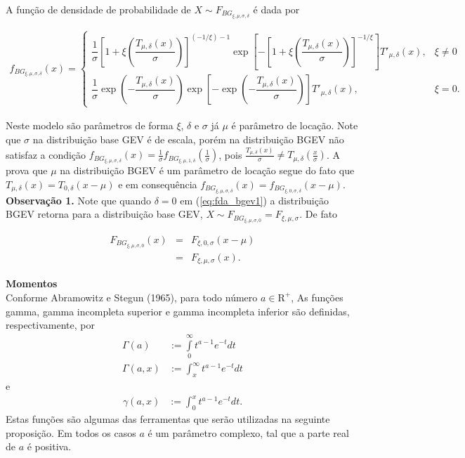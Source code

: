 \documentclass[pdftex,11pt]{article}%
\numberwithin{equation}{section} %
\begin{document}
A função de densidade de probabilidade   de $X\sim F_{BG_{\xi,\mu,\sigma, \delta}} $  é dada por

\begin{eqnarray}
	f_{BG_{\xi,\mu,\sigma, \delta}} (x)= \begin{cases}
		\dfrac{1}{\sigma} \left[ 1+ \xi \left(\dfrac{T_{\mu, \delta}(x)}{\sigma}\right) \right]^{(-1/\xi) -1} \exp\left[- \left[1+\xi\left(\dfrac{T_{\mu, \delta}(x)}        {\sigma}\right)\right]^{-1/\xi}\right] T'_{\mu, \delta}(x)
		, & \xi \neq 0 \\
		\dfrac{1}{\sigma} \exp \left( - \dfrac{T_{\mu, \delta}(x)}{\sigma} \right) \exp \left[- \exp \left( - \dfrac{T_{\mu, \delta}(x)}{\sigma}\right)  \right] T'_{\mu, \delta}(x), &  \xi=0.
	\end{cases}
	\label{eq:fdp_bgev2}
\end{eqnarray}

Neste modelo são parâmetros de forma $\xi$, $\delta$ e $\sigma$ já $\mu$ é parâmetro de locação. Note que $\sigma$ na distribuição base GEV é de escala, porém na distribuição BGEV não satisfaz a condição $f_{BG_{\xi,\mu,\sigma, \delta}}(x)=\frac{1}{\sigma}f_{BG_{\xi,\mu,1, \delta}}(\frac{1}{\sigma})$, pois $\frac{T_{\mu, \delta}(x)}{\sigma} \neq T_{\mu, \delta}(\frac{x}{\sigma})$.  A prova que $\mu$ na distribuição  BGEV é um parâmetro de locação segue do fato que $T_{\mu, \delta}(x)=T_{0, \delta}(x-\mu)$ e em consequência 
$f_{BG_{\xi,\mu,\sigma, \delta}}(x) = f_{BG_{\xi,0,\sigma, \delta}}(x-\mu)$.
\vspace{1cm}
\\
\textbf{Observação 1.} Note que quando $\delta=0$ em (\ref{eq:fda_bgev1})  a distribuição BGEV retorna para a distribuição base GEV, $X\sim F_{BG_{\xi,\mu,\sigma, 0}}= F_{\xi,\mu,\sigma}  $. De fato

\begin{eqnarray}
	F_{BG_{\xi,\mu,\sigma, 0}}(x) &=& F_{\xi, 0, \sigma}(x-\mu) \nonumber\\
	&=& F_{\xi, \mu, \sigma}(x).
\end{eqnarray}

	\textbf{Momentos}\\
	Conforme  Abramowitz   e Stegun (1965),  para todo número $a \in \mathrm{R}^{+}$, As funções gamma, gamma incompleta superior e gamma incompleta inferior são definidas, respectivamente, por 
	\begin{eqnarray}
		\Gamma(a)&:=\int\limits_{0}^{\infty}t^{a-1}e^{-t}dt \label{Gama}
		\\
		\Gamma{(a,x)}&:= \int_{x}^{\infty}t^{a-1}e^{-t}dt \label{GammaSup} 
	\end{eqnarray}
	e
	\begin{eqnarray}
		\gamma{(a,x)}&:= \int_{0}^{x}t^{a-1}e^{-t}dt\label{GammaInf}.
	\end{eqnarray}
	Estas funções são algumas das ferramentas que serão utilizadas na  seguinte proposição. Em todos os casos $a$ é um parâmetro complexo, tal que a parte real de $a$ é positiva.
	
\end{document}
